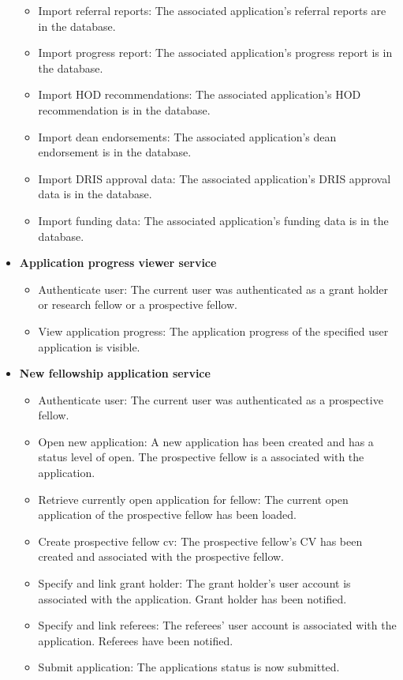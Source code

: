 \documentclass[12pt]{article}
\begin{document}
\begin{itemize}
\begin{itemize}
			\item Import referral reports: The associated application's referral reports are in the database.
			\item Import progress report: The associated application's progress report is in the database.
			\item Import HOD recommendations: The associated application's HOD recommendation is in the database.
			\item Import dean endorsements: The associated application's dean endorsement is in the database.
			\item Import DRIS approval data: The associated application's DRIS approval data is in the database.
			\item Import funding data: The associated application's funding data is in the database.				
		\end{itemize}
	\item \textbf{Application progress viewer service}
		\begin{itemize}
			\item Authenticate user: The current user was authenticated as a grant holder or research fellow or a prospective fellow.
			\item View application progress: The application progress of the specified user application is visible.									
		\end{itemize}				
		
	\item \textbf{New fellowship application service}
		\begin{itemize}
			\item Authenticate user: The current user was authenticated as a prospective fellow.
			\item Open new application: A new application has been created and has a status level of open. The prospective fellow is a associated with the application.
			\item Retrieve currently open application for fellow: The current open application of the prospective fellow has been loaded.
			\item Create prospective fellow cv: The prospective fellow's CV has been created and associated with the prospective fellow.
			\item Specify and link grant holder: The grant holder's user account is associated with the application. Grant holder has been notified.
			\item Specify and link referees: The referees' user account is associated with the application. Referees have been notified.
			\item Submit application: The applications status is now submitted.				
		\end{itemize}
	

\end{itemize}
\end{document}
